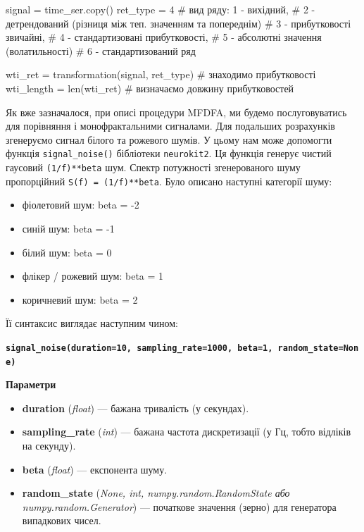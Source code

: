 \documentclass[
  letterpaper,
]{report}
\newenvironment{Shaded}{\begin{snugshade}}{\end{snugshade}}
\newcommand{\BuiltInTok}[1]{\textcolor[rgb]{0.00,0.23,0.31}{#1}}
\newcommand{\CommentTok}[1]{\textcolor[rgb]{0.37,0.37,0.37}{#1}}
\newcommand{\DecValTok}[1]{\textcolor[rgb]{0.68,0.00,0.00}{#1}}
\newcommand{\NormalTok}[1]{\textcolor[rgb]{0.00,0.23,0.31}{#1}}
\newcommand{\OperatorTok}[1]{\textcolor[rgb]{0.37,0.37,0.37}{#1}}
\providecommand{\tightlist}{%
  \setlength{\itemsep}{0pt}\setlength{\parskip}{0pt}}\usepackage{longtable,booktabs,array}
\begin{document}
\begin{Shaded}
\begin{Highlighting}[]
\NormalTok{signal }\OperatorTok{=}\NormalTok{ time\_ser.copy()}
\NormalTok{ret\_type }\OperatorTok{=} \DecValTok{4}    \CommentTok{\# вид ряду: 1 {-} вихідний, }
                \CommentTok{\# 2 {-} детрендований (різниця між теп. значенням та попереднім)}
                \CommentTok{\# 3 {-} прибутковості звичайні, }
                \CommentTok{\# 4 {-} стандартизовані прибутковості, }
                \CommentTok{\# 5 {-} абсолютні значення (волатильності)}
                \CommentTok{\# 6 {-} стандартизований ряд}

\NormalTok{wti\_ret }\OperatorTok{=}\NormalTok{ transformation(signal, ret\_type) }\CommentTok{\# знаходимо прибутковості }
\NormalTok{wti\_length }\OperatorTok{=} \BuiltInTok{len}\NormalTok{(wti\_ret)                  }\CommentTok{\# визначаємо довжину прибутковостей}
\end{Highlighting}
\end{Shaded}

Як вже зазначалося, при описі процедури MFDFA, ми будемо послуговуватись
для порівняння і монофрактальними сигналами. Для подальших розрахунків
згенеруємо сигнал білого та рожевого шумів. У цьому нам може допомогти
функція \texttt{signal\_noise()} бібліотеки \texttt{neurokit2}. Ця
функція генерує чистий гаусовий \texttt{(1/f)**beta} шум. Спектр
потужності згенерованого шуму пропорційний
\texttt{S(f)\ =\ (1/f)**beta}. Було описано наступні категорії шуму:

\begin{itemize}
\tightlist
\item
  фіолетовий шум: beta = -2
\item
  синій шум: beta = -1
\item
  білий шум: beta = 0
\item
  флікер / рожевий шум: beta = 1
\item
  коричневий шум: beta = 2
\end{itemize}

Її синтаксис виглядає наступним чином:

\textbf{\texttt{signal\_noise(duration=10,\ sampling\_rate=1000,\ beta=1,\ random\_state=None)}}

\textbf{Параметри}

\begin{itemize}
\tightlist
\item
  \textbf{duration} (\emph{float}) --- бажана тривалість (у секундах).
\item
  \textbf{sampling\_rate} (\emph{int}) --- бажана частота дискретизації
  (у Гц, тобто відліків на секунду).
\item
  \textbf{beta} (\emph{float}) --- експонента шуму.
\item
  \textbf{random\_state} (\emph{None, int, numpy.random.RandomState або
  numpy.random.Generator}) --- початкове значення (зерно) для генератора
  випадкових чисел.
\end{itemize}
\end{document}
